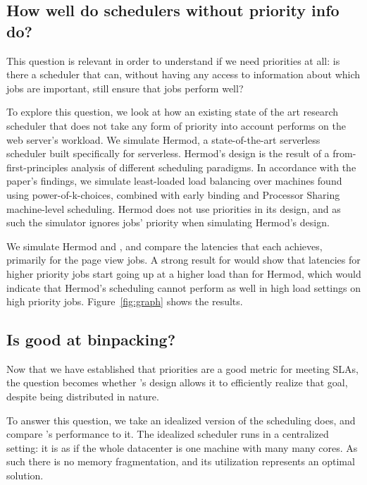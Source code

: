 \subsection{How well do schedulers without priority info do?}

This question is relevant in order to understand if we need priorities at all:
is there a scheduler that can, without having any access to information about
which jobs are important, still ensure that jobs perform well?

To explore this question, we look at how an existing state of the art research
scheduler that does not take any form of priority into account performs on the
web server's workload. We simulate Hermod\cite{TODO}, a state-of-the-art
serverless scheduler built specifically for serverless. Hermod's design is the
result of a from-first-principles analysis of different scheduling paradigms. In
accordance with the paper's findings, we simulate least-loaded load balancing
over machines found using power-of-k-choices, combined with early binding and
Processor Sharing machine-level scheduling. Hermod does not use priorities in
its design, and as such the simulator ignores jobs' priority when simulating
Hermod's design. 

We simulate Hermod and \sys{}, and compare the latencies that each achieves,
primarily for the page view jobs. A strong result for \sys{} would show that
latencies for higher priority jobs start going up at a higher load than for
Hermod, which would indicate that Hermod's scheduling cannot perform as well in
high load settings on high priority jobs. Figure~\ref{fig:graph} shows the
results.


\subsection{Is \sys{} good at binpacking?}

Now that we have established that priorities are a good metric for meeting SLAs,
the question becomes whether \sys{}'s design allows it to efficiently realize
that goal, despite being distributed in nature.

To answer this question, we take an idealized version of the scheduling \sys{}
does, and compare \sys{}'s performance to it. The idealized scheduler runs in a
centralized setting: it is as if the whole datacenter is one machine with many
many cores. As such there is no memory fragmentation, and its utilization
represents an optimal solution.

